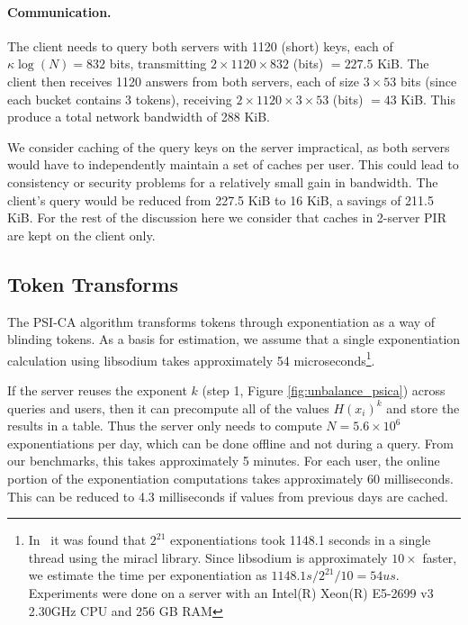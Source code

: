 \documentclass[11pt]{article} %
\newcommand{\psica}{PSI-CA\xspace}
\begin{document}
{	\paragraph{Communication.} The client needs to query both servers with 1120 (short) keys, each of $\kappa\log(N)=832$ bits, transmitting $2 \times 1120 \times 832$ (bits) $=227.5$ KiB. The client then receives 1120 answers from both servers, each of size $3 \times 53$ bits (since each bucket contains 3 tokens), receiving $2 \times 1120 \times 3 \times 53$ (bits) $= 43$ KiB. This produce a total network bandwidth of 288 KiB.
	
	We consider caching of the query keys on the server impractical, as both servers would have to independently maintain a set of caches per user. This could lead to consistency or security problems for a relatively small gain in bandwidth. The client's query would be reduced from 227.5 KiB to 16 KiB, a savings of 211.5 KiB. For the rest of the discussion here we consider that caches in 2-server PIR are kept on the client only.
	
	\subsection{Token Transforms}
	
	The \psica algorithm transforms tokens through exponentiation as a way of blinding tokens. As a basis for estimation, we assume that a single exponentiation calculation using libsodium takes approximately 54 microseconds\footnote{ In~\cite[Table~2]{C:PRTY19} it was found that $2^{21}$ exponentiations took 1148.1 seconds in a single thread using the miracl library. Since libsodium is approximately $10\times$ faster, we estimate the time per exponentiation as $1148.1 s / 2^{21} / 10 = 54 us$. Experiments were done on a server with an Intel(R) Xeon(R) E5-2699 v3 2.30GHz CPU and 256 GB RAM}.
	
	If the server reuses the exponent $k$ (step 1, Figure \ref{fig:unbalance_psica}) across queries and users, then it can precompute all of the values $H(x_i)^k$ and store the results in a table. Thus the server only needs to compute $N=5.6 \times 10^6$ exponentiations per day, which can be done offline and not during a query. From our benchmarks, this takes approximately 5 minutes. For each user, the online portion of the exponentiation computations takes approximately 60 milliseconds. %
	This can be reduced to 4.3 milliseconds if values from previous days are cached.
	
}
\end{document}
